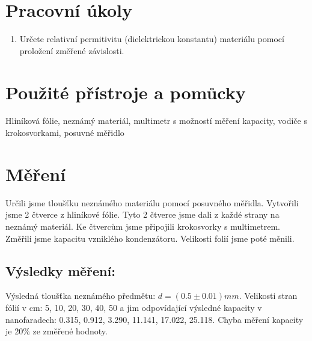 \section{Pracovní úkoly}

\begin{enumerate}


\item Určete relativní permitivitu (dielektrickou konstantu) materiálu pomocí proložení změřené závislosti.

\end{enumerate}



\section{Použité přístroje a pomůcky}
	Hliníková fólie, neznámý materiál, multimetr s možností měření kapacity, vodiče s krokosvorkami, posuvné měřidlo



	\section{Měření}
	Určili jsme tloušťku neznámého materiálu pomocí posuvného měřidla. Vytvořili jsme 2 čtverce z hliníkové fólie. Tyto 2 čtverce jsme dali z každé strany na neznámý materiál. Ke čtvercům jsme připojili krokosvorky s multimetrem. Změřili jsme kapacitu vzniklého kondenzátoru. Velikosti folií jsme poté měnili. 
	
	\subsection{Výsledky měření: }Výsledná tloušťka neznámého předmětu:  $d=(0.5\pm 0.01)mm$. Velikosti stran fólií v cm:  5, 10, 20, 30, 40, 50 a jim odpovídající výsledné kapacity v nanofaradech: 0.315,  0.912, 3.290,  11.141, 17.022, 25.118. Chyba měření kapacity je 20\% ze změřené hodnoty.

